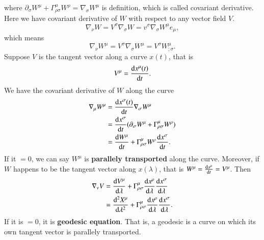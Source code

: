 \documentclass[openany,10pt]{book}
\theoremstyle{definition}
\theoremstyle{definition}
\theoremstyle{remark}
\begin{document}
where $\partial_\sigma W^\mu+\Gamma^\mu_{\rho\sigma}W^\rho=\nabla_\sigma W^\mu$ is definition, which is called covariant derivative.\\
Here we have covariant derivative of $W$ with respect to any vector field $V$.
\begin{equation}
    \nabla_\nu W=V^\sigma\nabla_\sigma W=v^\sigma\nabla_\sigma W^\mu e_\mu,
\end{equation}
which means 
\begin{equation}
    \nabla_\nu W^\mu=V^\sigma\nabla_\sigma W^\mu=V^\sigma W^\mu_{;\sigma}.
\end{equation}
Suppose $V$ is the tangent vector along a curve $x(t)$, that is 
\begin{equation}
    V^\mu=\frac{{\rm{d}}x^\mu(t)}{{\rm{d}}t}.
\end{equation}
We have the covariant derivative of $W$ along the curve 
\begin{equation}
    \begin{aligned}
    \nabla_\mu W^\mu&=\frac{{\rm{d}}x^\sigma(t)}{{\rm{d}}t}\nabla_\sigma W^\mu\\
    &=\frac{{\rm{d}}x^\sigma}{{\rm{d}}t}(\partial_\sigma W^\mu+\Gamma^\mu_{\rho\sigma}W^\rho)\\
    &=\frac{{\rm{d}}W^\mu}{{\rm{d}}t}+\Gamma^\mu_{\rho\sigma}W^\rho\frac{{\rm{d}}x^\sigma}{{\rm{d}}t}.
    \end{aligned}
\end{equation}
If it $=0$, we can say $W^\mu$ is \textbf{parallely transported} along the curve.
Moreover, if $W$ happens to be the tangent vector along $x(\lambda)$, that is $W^\mu=\frac{{\rm{d}}x^\mu}{{\rm{d}}t}=V^\mu$. Then 
\begin{equation}
    \begin{aligned}
        \nabla_\nu V&=\frac{{\rm{d}}V^\mu}{{\rm{d}}\lambda}+\Gamma^\mu_{\rho\sigma}\frac{{\rm{d}}x^\rho}{{\rm{d}}\lambda}\frac{{\rm{d}}x^\sigma}{{\rm{d}}\lambda}\\
        &=\frac{{\rm{d}}^2X^\mu}{{\rm{d}}\lambda^2}+\Gamma^\mu_{\rho\sigma}\frac{{\rm{d}}x^\rho}{{\rm{d}}\lambda}\frac{{\rm{d}}x^\sigma}{{\rm{d}}\lambda}.
    \end{aligned}
\end{equation}
If it is $=0$, it is \textbf{geodesic equation}. That is, a geodesic is a curve on which its own tangent vector is parallely transported.
\end{document}

